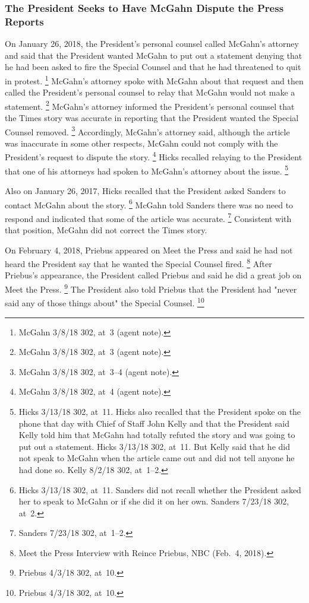 {\subsubsection{The President Seeks to Have McGahn Dispute the Press Reports}

On January 26, 2018, the President's personal counsel called McGahn's attorney and said that the President wanted McGahn to put out a statement denying that he had been asked to fire the Special Counsel and that he had threatened to quit in protest.%
\footnote{McGahn 3/8/18 302, at~3 (agent note).}
McGahn's attorney spoke with McGahn about that request and then called the President's personal counsel to relay that McGahn would not make a statement.%
\footnote{McGahn 3/8/18 302, at~3 (agent note).}
McGahn's attorney informed the President's personal counsel that the Times story was accurate in reporting that the President wanted the Special Counsel removed.%
\footnote{McGahn 3/8/18 302, at~3--4 (agent note).}
Accordingly, McGahn's attorney said, although the article was inaccurate in some other respects, McGahn could not comply with the President's request to dispute the story.%
\footnote{McGahn 3/8/18 302, at~4 (agent note).}
Hicks recalled relaying to the President that one of his attorneys had spoken to McGahn's attorney about the issue.%
\footnote{Hicks 3/13/18 302, at~11.
Hicks also recalled that the President spoke on the phone that day with Chief of Staff John Kelly and that the President said Kelly told him that McGahn had totally refuted the story and was going to put out a statement.
Hicks 3/13/18 302, at~11.
But Kelly said that he did not speak to McGahn when the article came out and did not tell anyone he had done so.
Kelly 8/2/18 302, at~1--2.}

Also on January 26, 2017, Hicks recalled that the President asked Sanders to contact McGahn about the story.%
\footnote{Hicks 3/13/18 302, at~11.
Sanders did not recall whether the President asked her to speak to McGahn or if she did it on her own.
Sanders 7/23/18 302, at~2.}
McGahn told Sanders there was no need to respond and indicated that some of the article was accurate.%
\footnote{Sanders 7/23/18 302, at~1--2.}
Consistent with that position, McGahn did not correct the Times story.

On February 4, 2018, Priebus appeared on Meet the Press and said he had not heard the President say that he wanted the Special Counsel fired.%
\footnote{Meet the Press Interview with Reince Priebus, NBC (Feb.~4, 2018).}
After Priebus's appearance, the President called Priebus and said he did a great job on Meet the Press.%
\footnote{Priebus 4/3/18 302, at~10.}
The President also told Priebus that the President had "never said any of those things about" the Special Counsel.%
\footnote{Priebus 4/3/18 302, at~10.}

}
